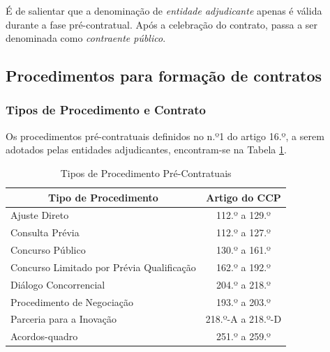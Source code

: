 É de salientar que a denominação  de \textit{entidade adjudicante} apenas é válida durante a fase pré-contratual. Após a celebração do contrato, passa a ser denominada como \textit{contraente público}. 



\subsection{Procedimentos para formação de contratos}

\subsubsection{Tipos de Procedimento e Contrato}
Os procedimentos pré-contratuais definidos no n.º1 do artigo 16.º, a serem adotados pelas entidades adjudicantes, encontram-se na Tabela \ref{table:2}.

\begin{table}[ht]
	\centering
	\renewcommand{\arraystretch}{1.15}
	\setlength{\tabcolsep}{15pt}
		\begin{tabular}{lc}
			\toprule
			\multicolumn{1}{c}{\textbf{Tipo de Procedimento}} & \textbf{Artigo do CCP} \\ 
			\midrule
			\rowcolor[HTML]{EFEFEF} 
			Ajuste Direto                                     & 112.º a 129.º          \\ 
			Consulta Prévia                                   & 112.º a 127.º          \\
			\rowcolor[HTML]{EFEFEF} 
			Concurso Público                                  & 130.º a 161.º          \\
			Concurso Limitado por Prévia Qualificação         & 162.º a 192.º          \\
			\rowcolor[HTML]{EFEFEF} 
			Diálogo Concorrencial                             & 204.º a 218.º          \\
			Procedimento de Negociação                        & 193.º a 203.º          \\
			\rowcolor[HTML]{EFEFEF} 
			Parceria para a Inovação                          & 218.º-A a 218.º-D      \\
			Acordos-quadro                                    & 251.º a 259.º          \\                             
			\bottomrule
		\end{tabular}
	\caption{Tipos de Procedimento Pré-Contratuais}
	\label{table:2}
\end{table}


